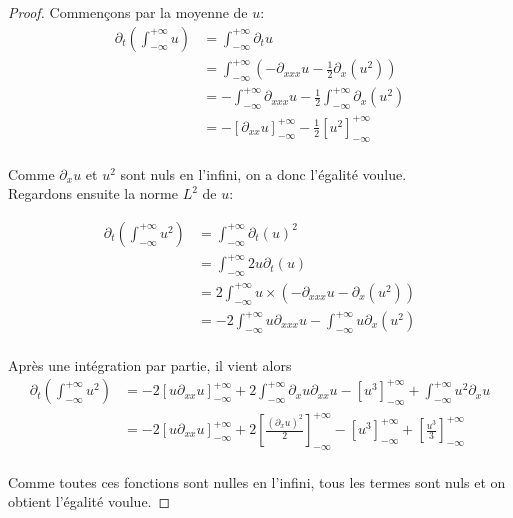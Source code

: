 \documentclass[12pt,a4paper]{article}
\numberwithin{equation}{section}
\begin{document}
\begin{proof}
    Commençons par la moyenne de $u$:
    \begin{equation}
        \begin{split}
            \partial_t\left(\int_{-\infty}^{+\infty}u\right) &= \int_{-\infty}^{+\infty}\partial_tu\\
            &= \int_{-\infty}^{+\infty}\left(-\partial_{xxx}u -\frac{1}{2}\partial_x(u^2)\right)\\
            &= -\int_{-\infty}^{+\infty}\partial_{xxx}u -\frac{1}{2}\int_{-\infty}^{+\infty}\partial_x(u^2)\\
            &= -\left[\partial_{xx}u\right]_{-\infty}^{+\infty} -\frac{1}{2}\left[u^2\right]_{-\infty}^{+\infty}\\
        \end{split}
    \end{equation}
    
    Comme $\partial_xu$ et $u^2$ sont nuls en l'infini, on a donc l'égalité voulue.\\

    Regardons ensuite la norme $L^2$ de $u$:

    \begin{equation}
        \begin{split}
            \partial_t\left(\int_{-\infty}^{+\infty}u^2\right) &= \int_{-\infty}^{+\infty}\partial_t(u)^2\\
            &= \int_{-\infty}^{+\infty}2u\partial_t(u)\\
            &= 2\int_{-\infty}^{+\infty}u\times\left(-\partial_{xxx}u -\partial_x(u^2)\right)\\
            &= -2\int_{-\infty}^{+\infty}u\partial_{xxx}u -\int_{-\infty}^{+\infty}u\partial_x(u^2)\\
        \end{split}
    \end{equation}
    
    Après une intégration par partie, il vient alors
    \begin{equation}
        \begin{split}
            \partial_t\left(\int_{-\infty}^{+\infty}u^2\right)
            &= -2\left[u\partial_{xx}u\right]_{-\infty}^{+\infty} + 2\int_{-\infty}^{+\infty}\partial_xu\partial_{xx}u -\left[u^3\right]_{-\infty}^{+\infty} +\int_{-\infty}^{+\infty}u^2\partial_xu\\
            &= -2\left[u\partial_{xx}u\right]_{-\infty}^{+\infty} + 2\left[\frac{(\partial_{x}u)^2}{2}\right]_{-\infty}^{+\infty} -\left[u^3\right]_{-\infty}^{+\infty} + \left[\frac{u^3}{3}\right]_{-\infty}^{+\infty}\\
        \end{split}
    \end{equation}

    Comme toutes ces fonctions sont nulles en l'infini, tous les termes sont nuls et on obtient l'égalité voulue.
\end{proof}
\end{document}
